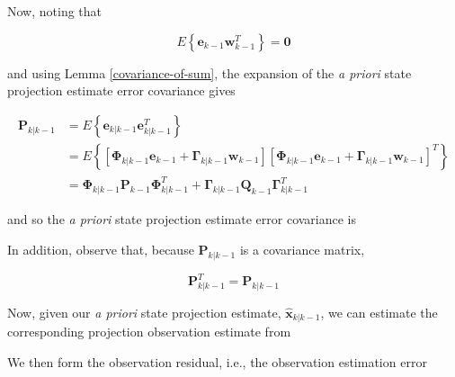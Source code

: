 Now, noting that

\begin{equation*}
    E \left\{ \mathbf{e}_{k-1} \mathbf{w}_{k-1}^T \right\} = \mathbf{0}
\end{equation*}

and using Lemma \ref{covariance-of-sum}, the expansion of the \textit{a priori} state
projection estimate error covariance gives

\begin{equation*}
    \begin{aligned}
        \mathbf{P}_{k|k-1} &= E \left\{ \mathbf{e}_{k|k-1} \mathbf{e}_{k|k-1}^T \right\} \\
        &= E \left\{ \left[ \mathbf{\Phi}_{k|k-1} \mathbf{e}_{k-1} + \mathbf{\Gamma}_{k|k-1} \mathbf{w}_{k-1} \right]
        \left[ \mathbf{\Phi}_{k|k-1} \mathbf{e}_{k-1} + \mathbf{\Gamma}_{k|k-1} \mathbf{w}_{k-1} \right]^T \right\} \\
        &= \mathbf{\Phi}_{k|k-1} \mathbf{P}_{k-1} \mathbf{\Phi}_{k|k-1}^T + \mathbf{\Gamma}_{k|k-1} \mathbf{Q}_{k-1} \mathbf{\Gamma}_{k|k-1}^T
    \end{aligned}
\end{equation*}

and so the \textit{a priori} state projection estimate error covariance is


In addition, observe that, because $\mathbf{P}_{k|k-1}$ is a covariance matrix,

\begin{equation*}
    \mathbf{P}_{k|k-1}^T = \mathbf{P}_{k|k-1}
\end{equation*}

Now, given our \textit{a priori} state projection estimate, $\hat{\mathbf{x}}_{k|k-1}$,
we can estimate the corresponding projection observation estimate from


We then form the observation residual, i.e., the observation estimation error

